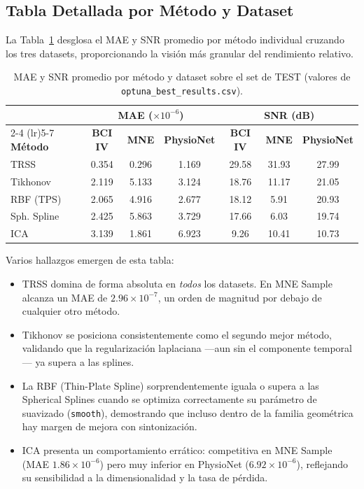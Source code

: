 \subsection{Tabla Detallada por Método y Dataset}

La Tabla~\ref{tab:pivot_detail} desglosa el MAE y SNR promedio por método individual cruzando los tres datasets, proporcionando la visión más granular del rendimiento relativo.

\begin{table}[ht]
\centering
\caption{MAE y SNR promedio por método y dataset sobre el set de TEST (valores de \texttt{optuna\_best\_results.csv}).}
\label{tab:pivot_detail}
\begin{tabular}{lcccccc}
\toprule
& \multicolumn{3}{c}{\textbf{MAE} ($\times 10^{-6}$)} & \multicolumn{3}{c}{\textbf{SNR} (dB)} \\
\cmidrule(lr){2-4} \cmidrule(lr){5-7}
\textbf{Método} & \textbf{BCI IV} & \textbf{MNE} & \textbf{PhysioNet} & \textbf{BCI IV} & \textbf{MNE} & \textbf{PhysioNet} \\
\midrule
TRSS         & 0.354 & 0.296 & 1.169 & 29.58 & 31.93 & 27.99 \\
Tikhonov     & 2.119 & 5.133 & 3.124 & 18.76 & 11.17 & 21.05 \\
RBF (TPS)    & 2.065 & 4.916 & 2.677 & 18.12 & 5.91  & 20.93 \\
Sph. Spline  & 2.425 & 5.863 & 3.729 & 17.66 & 6.03  & 19.74 \\
ICA          & 3.139 & 1.861 & 6.923 & 9.26  & 10.41 & 10.73 \\
\bottomrule
\end{tabular}
\end{table}

Varios hallazgos emergen de esta tabla:
\begin{itemize}
    \item TRSS domina de forma absoluta en \textit{todos} los datasets. En MNE Sample alcanza un MAE de $2.96 \times 10^{-7}$, un orden de magnitud por debajo de cualquier otro método.
    \item Tikhonov se posiciona consistentemente como el segundo mejor método, validando que la regularización laplaciana ---aun sin el componente temporal--- ya supera a las splines.
    \item La RBF (Thin-Plate Spline) sorprendentemente iguala o supera a las Spherical Splines cuando se optimiza correctamente su parámetro de suavizado (\texttt{smooth}), demostrando que incluso dentro de la familia geométrica hay margen de mejora con sintonización.
    \item ICA presenta un comportamiento errático: competitiva en MNE Sample (MAE $1.86 \times 10^{-6}$) pero muy inferior en PhysioNet ($6.92 \times 10^{-6}$), reflejando su sensibilidad a la dimensionalidad y la tasa de pérdida.
\end{itemize}

